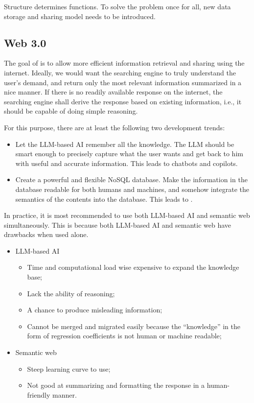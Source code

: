Structure determines functions. To solve the problem once for all, new data storage and sharing model needs to be introduced.

\subsection{Web 3.0}

The goal of  is to allow more efficient information retrieval and sharing using the internet. Ideally, we would want the searching engine to truly understand the user's demand, and return only the most relevant information summarized in a nice manner. If there is no readily available response on the internet, the searching engine shall derive the response based on existing information, i.e., it should be capable of doing simple reasoning. 

For this purpose, there are at least the following two development trends:
\begin{itemize}
  \item Let the LLM-based AI remember all the knowledge. The LLM should be smart enough to precisely capture what the user wants and get back to him with useful and accurate information. This leads to chatbots and copilots.
  \item Create a powerful and flexible NoSQL database. Make the information in the database readable for both humans and machines, and somehow integrate the semantics of the contents into the database. This leads to .
\end{itemize}

In practice, it is most recommended to use both LLM-based AI and semantic web simultaneously. This is because both LLM-based AI and semantic web have drawbacks when used alone.
\begin{itemize}
	\item LLM-based AI
	\begin{itemize}
		\item Time and computational load wise expensive to expand the knowledge base;
		\item Lack the ability of reasoning;
		\item A chance to produce misleading information;
		\item Cannot be merged and migrated easily because the ``knowledge'' in the form of regression coefficients is not human or machine readable;
	\end{itemize}
	\item Semantic web
	\begin{itemize}
		\item Steep learning curve to use;
		\item Not good at summarizing and formatting the response in a human-friendly manner.
	\end{itemize}
\end{itemize}

